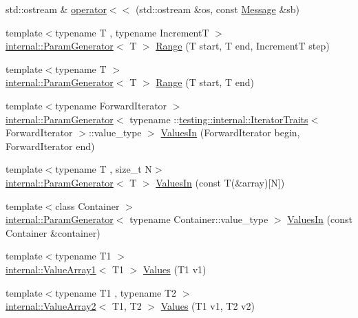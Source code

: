 \begin{DoxyCompactItemize}
\item 
std\+::ostream \& \mbox{\hyperlink{namespacetesting_a7b802e532fd68749765cb7dc156130db}{operator$<$$<$}} (std\+::ostream \&os, const \mbox{\hyperlink{classtesting_1_1Message}{Message}} \&sb)
\item 
{\footnotesize template$<$typename T , typename IncrementT $>$ }\\\mbox{\hyperlink{classtesting_1_1internal_1_1ParamGenerator}{internal\+::\+Param\+Generator}}$<$ T $>$ \mbox{\hyperlink{namespacetesting_a265ed70a86cf2d6641582c45ad9529e2}{Range}} (T start, T end, IncrementT step)
\item 
{\footnotesize template$<$typename T $>$ }\\\mbox{\hyperlink{classtesting_1_1internal_1_1ParamGenerator}{internal\+::\+Param\+Generator}}$<$ T $>$ \mbox{\hyperlink{namespacetesting_a56a45f85a1238dfc92e6fca03eb3a2e4}{Range}} (T start, T end)
\item 
{\footnotesize template$<$typename Forward\+Iterator $>$ }\\\mbox{\hyperlink{classtesting_1_1internal_1_1ParamGenerator}{internal\+::\+Param\+Generator}}$<$ typename \+::\mbox{\hyperlink{structtesting_1_1internal_1_1IteratorTraits}{testing\+::internal\+::\+Iterator\+Traits}}$<$ Forward\+Iterator $>$\+::value\+\_\+type $>$ \mbox{\hyperlink{namespacetesting_a96240380ae4d3b4855d07de3b84fb336}{Values\+In}} (Forward\+Iterator begin, Forward\+Iterator end)
\item 
{\footnotesize template$<$typename T , size\+\_\+t N$>$ }\\\mbox{\hyperlink{classtesting_1_1internal_1_1ParamGenerator}{internal\+::\+Param\+Generator}}$<$ T $>$ \mbox{\hyperlink{namespacetesting_affa90ba3821bd7ac15f147b1c31f9a73}{Values\+In}} (const T(\&array)\mbox{[}N\mbox{]})
\item 
{\footnotesize template$<$class Container $>$ }\\\mbox{\hyperlink{classtesting_1_1internal_1_1ParamGenerator}{internal\+::\+Param\+Generator}}$<$ typename Container\+::value\+\_\+type $>$ \mbox{\hyperlink{namespacetesting_aa67d0c8470c5f69fcfcacc9e775fa982}{Values\+In}} (const Container \&container)
\item 
{\footnotesize template$<$typename T1 $>$ }\\\mbox{\hyperlink{classtesting_1_1internal_1_1ValueArray1}{internal\+::\+Value\+Array1}}$<$ T1 $>$ \mbox{\hyperlink{namespacetesting_a8209ef59db08b8ad4beed30d8d6e6a88}{Values}} (T1 v1)
\item 
{\footnotesize template$<$typename T1 , typename T2 $>$ }\\\mbox{\hyperlink{classtesting_1_1internal_1_1ValueArray2}{internal\+::\+Value\+Array2}}$<$ T1, T2 $>$ \mbox{\hyperlink{namespacetesting_a7cfec131dd8773430fb87483509cc6d0}{Values}} (T1 v1, T2 v2)

\end{DoxyCompactItemize}
